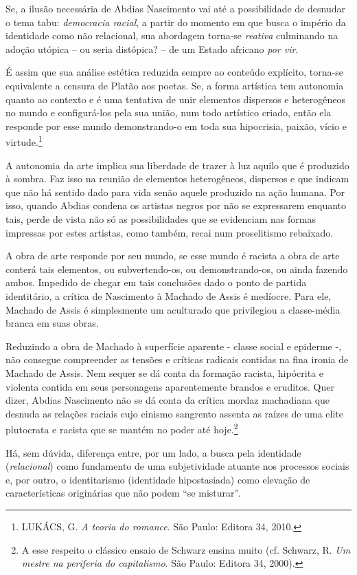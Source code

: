 Se, a ilusão necessária de Abdias Nascimento vai até a possibilidade de
desnudar o tema tabu: \emph{democracia racial}, a partir do momento em
que busca o império da identidade como não relacional, sua abordagem
torna-se \emph{reativa} culminando na adoção utópica -- ou seria
distópica? -- de um Estado africano \emph{por vir}.

É assim que sua análise estética reduzida sempre ao conteúdo explícito,
torna-se equivalente a censura de Platão aos poetas. Se, a forma
artística tem autonomia quanto ao contexto e é uma tentativa de unir
elementos dispersos e heterogêneos no mundo e configurá-los pela sua
união, num todo artístico criado, então ela responde por esse mundo
demonstrando-o em toda sua hipocrisia, paixão, vício e
virtude.\footnote{LUKÁCS, G. \emph{A teoria do romance}. São Paulo:
  Editora 34, 2010.}

A autonomia da arte implica sua liberdade de trazer à luz aquilo que é
produzido à sombra. Faz isso na reunião de elementos heterogêneos,
dispersos e que indicam que não há sentido dado para vida senão aquele
produzido na ação humana. Por isso, quando Abdias condena os artistas
negros por não se expressarem enquanto tais, perde de vista não só as
possibilidades que se evidenciam nas formas impressas por estes
artistas, como também, recai num proselitismo rebaixado.

A obra de arte responde por seu mundo, se esse mundo é racista a obra de
arte conterá tais elementos, ou subvertendo-os, ou demonstrando-os, ou
ainda fazendo ambos. Impedido de chegar em tais conclusões dado o ponto
de partida identitário, a crítica de Nascimento à Machado de Assis é
medíocre. Para ele, Machado de Assis é simplesmente um aculturado que
privilegiou a classe-média branca em suas obras.

Reduzindo a obra de Machado à superfície aparente - classe social e
epiderme -, não consegue compreender as tensões e críticas radicais
contidas na fina ironia de Machado de Assis. Nem sequer se dá conta da
formação racista, hipócrita e violenta contida em seus personagens
aparentemente brandos e eruditos. Quer dizer, Abdias Nascimento não se
dá conta da crítica mordaz machadiana que desnuda as relações raciais
cujo cinismo sangrento assenta as raízes de uma elite plutocrata e
racista que se mantém no poder até hoje.\footnote{A esse respeito o
  clássico ensaio de Schwarz ensina muito (cf. Schwarz, R. \emph{Um
  mestre na periferia do capitalismo}. São Paulo: Editora 34, 2000).}

Há, sem dúvida, diferença entre, por um lado, a busca pela identidade
(\emph{relacional}) como fundamento de uma subjetividade atuante nos
processos sociais e, por outro, o identitarismo (identidade
hipostasiada) como elevação de características originárias que não podem
``se misturar''.

